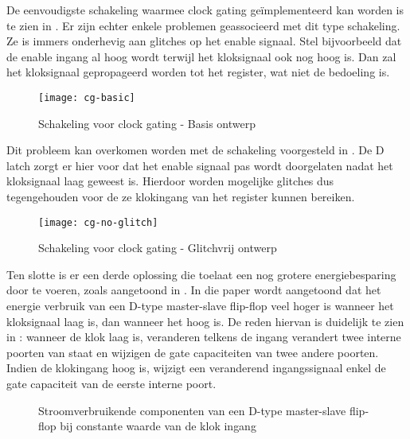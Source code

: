 De eenvoudigste schakeling waarmee clock gating ge\"implementeerd kan worden is te zien in . Er zijn echter enkele problemen geassocieerd met dit type schakeling. Ze is immers onderhevig aan glitches op het enable signaal. Stel bijvoorbeeld dat de enable ingang al hoog wordt terwijl het kloksignaal ook nog hoog is. Dan zal het kloksignaal gepropageerd worden tot het register, wat niet de bedoeling is.

\begin{figure}[h]
	\centering
		\texttt{[image: cg-basic]}
		\caption{Schakeling voor clock gating - Basis ontwerp\label{figuur-implementatie-optimalisatie-cg-basic}}
\end{figure}

Dit probleem kan overkomen worden met de schakeling voorgesteld in . De D latch zorgt er hier voor dat het enable signaal pas wordt doorgelaten nadat het kloksignaal laag geweest is. Hierdoor worden mogelijke glitches dus tegengehouden voor de ze klokingang van het register kunnen bereiken.

\begin{figure}[h]
	\centering
		\texttt{[image: cg-no-glitch]}
		\caption{Schakeling voor clock gating - Glitchvrij ontwerp\label{figuur-implementatie-optimalisatie-cg-no-glitch}}
\end{figure}

Ten slotte is er een derde oplossing die toelaat een nog grotere energiebesparing door te voeren, zoals aangetoond in \cite{mueller}. In die paper wordt aangetoond dat het energie verbruik van een D-type master-slave flip-flop veel hoger is wanneer het kloksignaal laag is, dan wanneer het hoog is. De reden hiervan is duidelijk te zien in : wanneer de klok laag is, veranderen telkens de ingang verandert twee interne poorten van staat en wijzigen de gate capaciteiten van twee andere poorten. Indien de klokingang hoog is, wijzigt een veranderend ingangssignaal enkel de gate capaciteit van de eerste interne poort.

\begin{figure}[h]
	\centering
		\caption[Stroomverbruikende componenten van een D-type master-slave flip-flop bij constante waarde van de klok ingang]{Stroomverbruikende componenten van een D-type master-slave flip-flop bij constante waarde van de klok ingang \protect\cite{mueller}\label{figuur-implementatie-optimalisatie-cg-power-dis}}
\end{figure}

